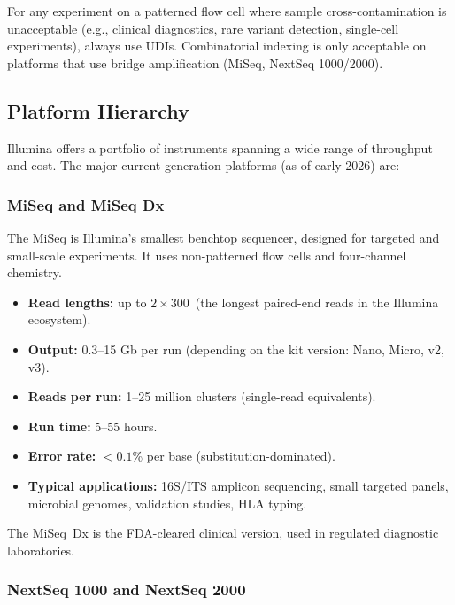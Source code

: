 \begin{warningbox}
For any experiment on a patterned flow cell where sample cross-contamination is unacceptable (e.g., clinical diagnostics, rare variant detection, single-cell experiments), always use UDIs. Combinatorial indexing is only acceptable on platforms that use bridge amplification (MiSeq, NextSeq 1000/2000).
\end{warningbox}


\subsection{Platform Hierarchy}
\label{sec:illumina_platforms}

Illumina offers a portfolio of instruments spanning a wide range of throughput and cost. The major current-generation platforms (as of early 2026) are:

\subsubsection{MiSeq and MiSeq\texorpdfstring{\texttrademark}{(TM)} Dx}

The MiSeq is Illumina's smallest benchtop sequencer, designed for targeted and small-scale experiments. It uses non-patterned flow cells and four-channel chemistry.

\begin{itemize}[nosep]
  \item \textbf{Read lengths:} up to $2 \times 300$\basepair\ (the longest paired-end reads in the Illumina ecosystem).
  \item \textbf{Output:} 0.3--15 Gb per run (depending on the kit version: Nano, Micro, v2, v3).
  \item \textbf{Reads per run:} 1--25 million clusters (single-read equivalents).
  \item \textbf{Run time:} 5--55 hours.
  \item \textbf{Error rate:} $<0.1$\% per base (substitution-dominated).
  \item \textbf{Typical applications:} 16S/ITS amplicon sequencing, small targeted panels, microbial genomes, validation studies, HLA typing.
\end{itemize}

The MiSeq~Dx is the FDA-cleared clinical version, used in regulated diagnostic laboratories.

\subsubsection{NextSeq 1000 and NextSeq 2000}

